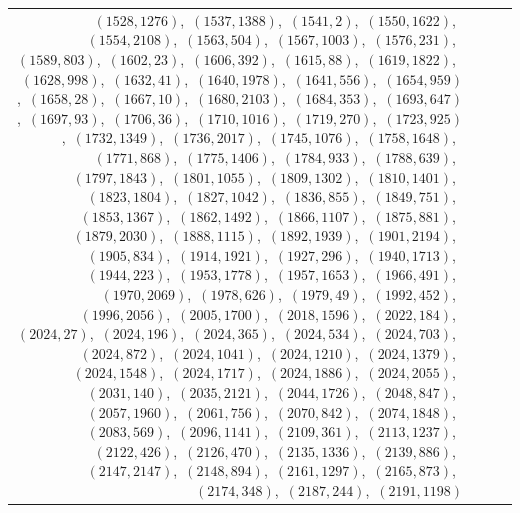 \documentclass[11pt]{article}
\begin{document}
\begin{longtable}{@{}rrl>{\raggedright\arraybackslash}p{}@{}}
$(1528,1276)$,\allowbreak\ $(1537,1388)$,\allowbreak\ $(1541,2)$,\allowbreak\ $(1550,1622)$,\allowbreak\ $(1554,2108)$,\allowbreak\ $(1563,504)$,\allowbreak\ $(1567,1003)$,\allowbreak\ $(1576,231)$,\allowbreak\ $(1589,803)$,\allowbreak\ $(1602,23)$,\allowbreak\ $(1606,392)$,\allowbreak\ $(1615,88)$,\allowbreak\ $(1619,1822)$,\allowbreak\ $(1628,998)$,\allowbreak\ $(1632,41)$,\allowbreak\ $(1640,1978)$,\allowbreak\ $(1641,556)$,\allowbreak\ $(1654,959)$,\allowbreak\ $(1658,28)$,\allowbreak\ $(1667,10)$,\allowbreak\ $(1680,2103)$,\allowbreak\ $(1684,353)$,\allowbreak\ $(1693,647)$,\allowbreak\ $(1697,93)$,\allowbreak\ $(1706,36)$,\allowbreak\ $(1710,1016)$,\allowbreak\ $(1719,270)$,\allowbreak\ $(1723,925)$,\allowbreak\ $(1732,1349)$,\allowbreak\ $(1736,2017)$,\allowbreak\ $(1745,1076)$,\allowbreak\ $(1758,1648)$,\allowbreak\ $(1771,868)$,\allowbreak\ $(1775,1406)$,\allowbreak\ $(1784,933)$,\allowbreak\ $(1788,639)$,\allowbreak\ $(1797,1843)$,\allowbreak\ $(1801,1055)$,\allowbreak\ $(1809,1302)$,\allowbreak\ $(1810,1401)$,\allowbreak\ $(1823,1804)$,\allowbreak\ $(1827,1042)$,\allowbreak\ $(1836,855)$,\allowbreak\ $(1849,751)$,\allowbreak\ $(1853,1367)$,\allowbreak\ $(1862,1492)$,\allowbreak\ $(1866,1107)$,\allowbreak\ $(1875,881)$,\allowbreak\ $(1879,2030)$,\allowbreak\ $(1888,1115)$,\allowbreak\ $(1892,1939)$,\allowbreak\ $(1901,2194)$,\allowbreak\ $(1905,834)$,\allowbreak\ $(1914,1921)$,\allowbreak\ $(1927,296)$,\allowbreak\ $(1940,1713)$,\allowbreak\ $(1944,223)$,\allowbreak\ $(1953,1778)$,\allowbreak\ $(1957,1653)$,\allowbreak\ $(1966,491)$,\allowbreak\ $(1970,2069)$,\allowbreak\ $(1978,626)$,\allowbreak\ $(1979,49)$,\allowbreak\ $(1992,452)$,\allowbreak\ $(1996,2056)$,\allowbreak\ $(2005,1700)$,\allowbreak\ $(2018,1596)$,\allowbreak\ $(2022,184)$,\allowbreak\ $(2024,27)$,\allowbreak\ $(2024,196)$,\allowbreak\ $(2024,365)$,\allowbreak\ $(2024,534)$,\allowbreak\ $(2024,703)$,\allowbreak\ $(2024,872)$,\allowbreak\ $(2024,1041)$,\allowbreak\ $(2024,1210)$,\allowbreak\ $(2024,1379)$,\allowbreak\ $(2024,1548)$,\allowbreak\ $(2024,1717)$,\allowbreak\ $(2024,1886)$,\allowbreak\ $(2024,2055)$,\allowbreak\ $(2031,140)$,\allowbreak\ $(2035,2121)$,\allowbreak\ $(2044,1726)$,\allowbreak\ $(2048,847)$,\allowbreak\ $(2057,1960)$,\allowbreak\ $(2061,756)$,\allowbreak\ $(2070,842)$,\allowbreak\ $(2074,1848)$,\allowbreak\ $(2083,569)$,\allowbreak\ $(2096,1141)$,\allowbreak\ $(2109,361)$,\allowbreak\ $(2113,1237)$,\allowbreak\ $(2122,426)$,\allowbreak\ $(2126,470)$,\allowbreak\ $(2135,1336)$,\allowbreak\ $(2139,886)$,\allowbreak\ $(2147,2147)$,\allowbreak\ $(2148,894)$,\allowbreak\ $(2161,1297)$,\allowbreak\ $(2165,873)$,\allowbreak\ $(2174,348)$,\allowbreak\ $(2187,244)$,\allowbreak\ $(2191,1198)$\\

\end{longtable}
\end{document}
